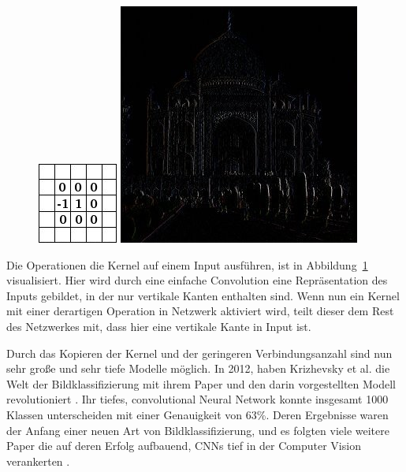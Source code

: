 \documentclass[pdftex,a4paper,halfparskip, article]{scrartcl}
\begin{document}
\begin{figure}
\centering
\begin{minipage}{.5\textwidth}
  \centering
  \includegraphics[width=.3\linewidth]{gimp_doku_edges_kernel}
\end{minipage}%
\begin{minipage}{.5\textwidth}
  \centering
  \includegraphics[width=.8\linewidth]{gimp_doku_edges}
  \end{minipage}
  \label{fig:kernel}
\end{figure}

Die Operationen die Kernel auf einem Input ausführen, ist in Abbildung~\ref{fig:kernel} visualisiert. Hier wird durch eine einfache Convolution eine Repräsentation des Inputs gebildet, in der nur vertikale Kanten enthalten sind. Wenn nun ein Kernel mit einer derartigen Operation in Netzwerk aktiviert wird, teilt dieser dem Rest des Netzwerkes mit, dass hier eine vertikale Kante in Input ist.

Durch das Kopieren der Kernel und der geringeren Verbindungsanzahl sind nun sehr große und sehr tiefe Modelle möglich. In 2012, haben Krizhevsky et al. die Welt der Bildklassifizierung mit ihrem Paper und den darin vorgestellten Modell revolutioniert \cite{ImageNetOriginal}. Ihr tiefes, convolutional Neural Network konnte insgesamt 1000 Klassen unterscheiden mit einer Genauigkeit von 63\%. Deren Ergebnisse waren der Anfang einer neuen Art von Bildklassifizierung, und es folgten viele weitere Paper die auf deren Erfolg aufbauend, CNNs tief in der Computer Vision verankerten \cite{colahsBlogCnn}.
\end{document}
